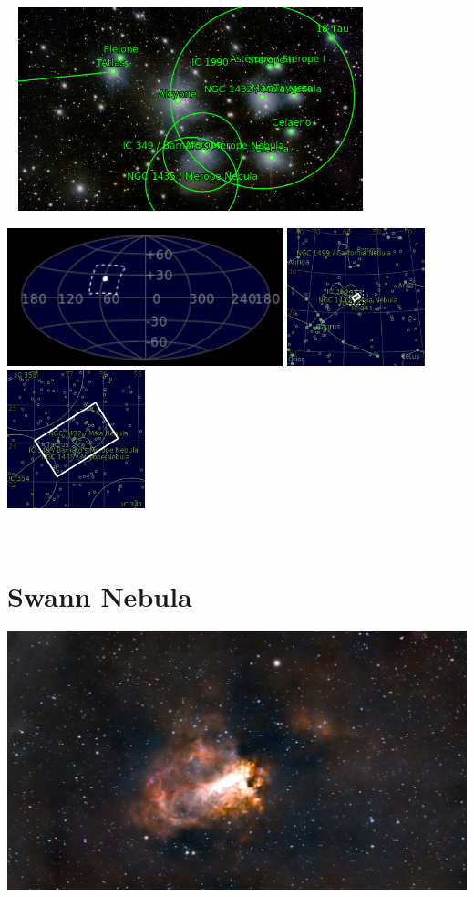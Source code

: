 \begin{center}
 \ \newpage
\includegraphics[width=0.75\textwidth]{../Imaging//Annotated/Pleiades_Cluster_Annotated.jpg}

\includegraphics[height=4cm]{../Imaging//Annotated/Pleiades_Cluster_Globe.jpg}
\includegraphics[height=4cm]{../Imaging//Annotated/Pleiades_Cluster_Close.jpg}
\includegraphics[height=4cm]{../Imaging//Annotated/Pleiades_Cluster_Closer.jpg}
\end{center}
\ \\\section{Swann Nebula}
\includegraphics[width=\textwidth]{../Imaging//Original/Swann_Nebula.jpg}
